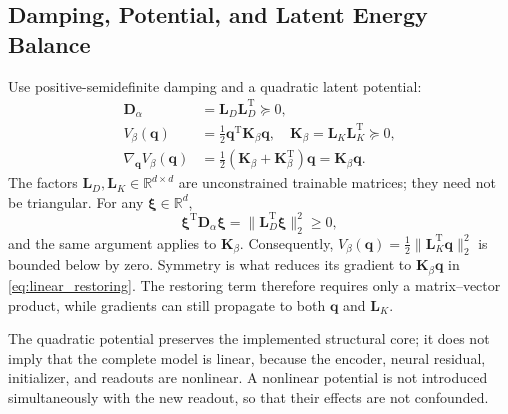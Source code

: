 \documentclass[journal,twoside]{IEEEtran}
\begin{document}
\subsection{Damping, Potential, and Latent Energy Balance}
\label{subsec:energy}
Use positive-semidefinite damping and a quadratic latent potential:
\begin{align}
    \mathbf D_\alpha&=\mathbf L_D\mathbf L_D^{\mathrm T}\succeq0,
    \label{eq:damping_constraint}\\
    V_\beta(\mathbf q)&=\tfrac12\mathbf q^{\mathrm T}\mathbf K_\beta\mathbf q,
    \quad \mathbf K_\beta=\mathbf L_K\mathbf L_K^{\mathrm T}\succeq0,
    \label{eq:quadratic_potential}\\
    \nabla_{\mathbf q}V_\beta(\mathbf q)
    &=\tfrac12(\mathbf K_\beta+\mathbf K_\beta^{\mathrm T})\mathbf q
    =\mathbf K_\beta\mathbf q.
    \label{eq:linear_restoring}
\end{align}
The factors $\mathbf L_D,\mathbf L_K\in\mathbb R^{d\times d}$ are
unconstrained trainable matrices; they need not be triangular. For any
$\boldsymbol\xi\in\mathbb R^d$,
\begin{equation}
    \boldsymbol\xi^{\mathrm T}\mathbf D_\alpha\boldsymbol\xi
    =\|\mathbf L_D^{\mathrm T}\boldsymbol\xi\|_2^2\geq0,
    \label{eq:damping_psd_proof}
\end{equation}
and the same argument applies to $\mathbf K_\beta$. Consequently,
$V_\beta(\mathbf q)=\tfrac12\|\mathbf L_K^{\mathrm T}\mathbf q\|_2^2$
is bounded below by zero. Symmetry is what reduces its gradient to
$\mathbf K_\beta\mathbf q$ in \eqref{eq:linear_restoring}. The restoring
term therefore requires only a matrix--vector product, while gradients
can still propagate to both $\mathbf q$ and $\mathbf L_K$.

The quadratic potential preserves the implemented structural core; it
does not imply that the complete model is linear, because the encoder,
neural residual, initializer, and readouts are nonlinear. A nonlinear
potential is not introduced simultaneously with the new readout, so that
their effects are not confounded.
\end{document}
